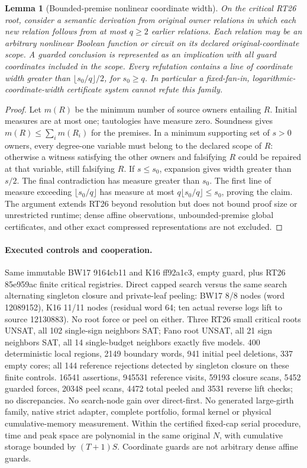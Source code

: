\documentclass[11pt]{article}
\newtheorem{lemma}[theorem]{Lemma}
\begin{document}
\begin{lemma}[Bounded-premise nonlinear coordinate width]\label{lem:bh20-width}
On the critical RT26 root, consider a semantic derivation from original owner relations in which each new relation follows from at most $q\ge2$ earlier relations. Each relation may be an arbitrary nonlinear Boolean function or circuit on its declared original-coordinate scope. A guarded conclusion is represented as an implication with all guard coordinates included in the scope. Every refutation contains a line of coordinate width greater than $\lfloor s_0/q\rfloor/2$, for $s_0\ge q$. In particular a fixed-fan-in, logarithmic-coordinate-width certificate system cannot refute this family.
\end{lemma}
\begin{proof}
Let $m(R)$ be the minimum number of source owners entailing $R$. Initial measures are at most one; tautologies have measure zero. Soundness gives $m(R)\le\sum_i m(R_i)$ for the premises. In a minimum supporting set of $s>0$ owners, every degree-one variable must belong to the declared scope of $R$: otherwise a witness satisfying the other owners and falsifying $R$ could be repaired at that variable, still falsifying $R$. If $s\le s_0$, expansion gives width greater than $s/2$. The final contradiction has measure greater than $s_0$. The first line of measure exceeding $\lfloor s_0/q\rfloor$ has measure at most $q\lfloor s_0/q\rfloor\le s_0$, proving the claim. The argument extends RT26 beyond resolution but does not bound proof size or unrestricted runtime; dense affine observations, unbounded-premise global certificates, and other exact compressed representations are not excluded.
\end{proof}
\paragraph{Executed controls and cooperation.}
Same immutable BW17 9164cb11 and K16 ff92a1c3, empty guard, plus RT26 85e959ac finite critical registries. Direct capped search versus the same search alternating singleton closure and private-leaf peeling: BW17 8/8 nodes (word 12089152), K16 11/11 nodes (residual word 64; ten actual reverse logs lift to source 12130883). No root force or peel on either. Three RT26 small critical roots UNSAT, all 102 single-sign neighbors SAT; Fano root UNSAT, all 21 sign neighbors SAT, all 14 single-budget neighbors exactly five models. 400 deterministic local regions, 2149 boundary words, 941 initial peel deletions, 337 empty cores; all 144 reference rejections detected by singleton closure on these finite controls. 16541 assertions, 945531 reference visits, 59193 closure scans, 5452 guarded forces, 20348 peel scans, 4472 total peeled and 3531 reverse lift checks; no discrepancies. No search-node gain over direct-first. No generated large-girth family, native strict adapter, complete portfolio, formal kernel or physical cumulative-memory measurement. Within the certified fixed-cap serial procedure, time and peak space are polynomial in the same original $N$, with cumulative storage bounded by $(T+1)S$. Coordinate guards are not arbitrary dense affine guards.
\end{document}
